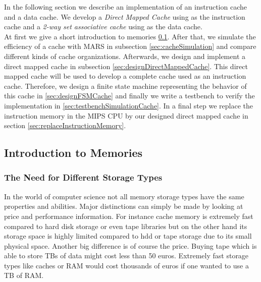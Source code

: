 In the following section we describe an implementation of an instruction cache and a data cache. We develop a \textit{Direct Mapped Cache} using as the instruction cache and a \textit{2-way set associative cache} using as the data cache.\\
At first we give a short introduction to memories \ref{sec:introductionToMemories}. After that, we simulate the efficiency of a cache with MARS in subsection \ref{sec:cacheSimulation} and compare different kinds of cache organizations. Afterwards, we design and implement a direct mapped cache in subsection \ref{sec:designDirectMappedCache}. This direct mapped cache will be used to develop a complete cache used as an instruction cache. Therefore, we design a finite state machine representing the behavior of this cache in \ref{sec:designFSMCache} and finally we write a testbench to verify the implementation in \ref{sec:testbenchSimulationCache}. In a final step we replace the instruction memory in the MIPS CPU by our designed direct mapped cache in section \ref{sec:replaceInstructionMemory}.

\subsection{Introduction to Memories}
\label{sec:introductionToMemories}

\subsubsection{The Need for Different Storage Types}
\label{sec:needForDifferentStorageTypes}
In the world of computer science not all memory storage types have the same properties and abilities. Major distinctions can simply be made by looking at price and performance information. For instance cache memory is extremely fast compared to hard disk storage or even tape libraries but on the other hand its storage space is highly limited compared to hdd or tape storage due to its small physical space. Another big difference is of course the price. Buying tape which is able to store TBs of data might cost less than 50 euros. Extremely fast storage types like caches or RAM would cost thousands of euros if one wanted to use a TB of RAM.

